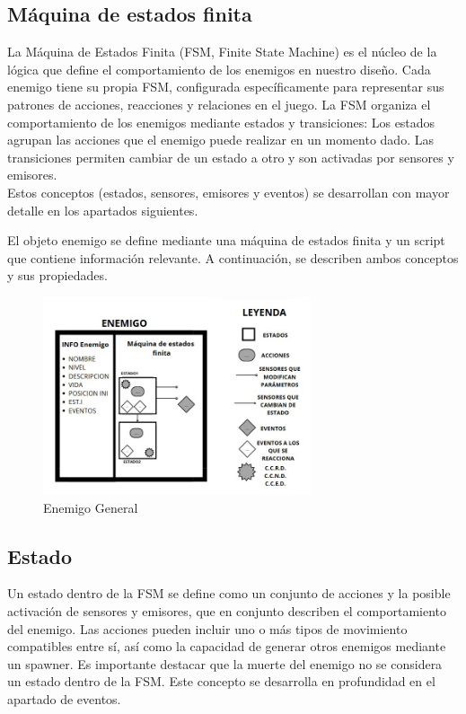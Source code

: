 \subsection{Máquina de estados finita}

La Máquina de Estados Finita (FSM, Finite State Machine) es el núcleo de la lógica que define el comportamiento de los enemigos en nuestro diseño. Cada enemigo tiene su propia FSM, configurada específicamente para representar sus patrones de acciones, reacciones y relaciones en el juego. La FSM organiza el comportamiento de los enemigos mediante estados y transiciones:
Los estados agrupan las acciones que el enemigo puede realizar en un momento dado.
Las transiciones permiten cambiar de un estado a otro y son activadas por sensores y emisores.\\
Estos conceptos (estados, sensores, emisores y eventos) se desarrollan con mayor detalle en los apartados siguientes.

El objeto enemigo se define mediante una máquina de estados finita y un script que contiene información relevante. A continuación, se describen ambos conceptos y sus propiedades.\\
\begin{figure}[h]
	\centering
	\includegraphics[width = 0.7\textwidth]{Imagenes/EnemigoGeneral.png}
	\caption{Enemigo General }
	\label{fig:EnemigoGeneral}
\end{figure}

\subsection{Estado}
Un estado dentro de la FSM se define como un conjunto de acciones y la posible activación de sensores y emisores, que en conjunto describen el comportamiento del enemigo. Las acciones pueden incluir uno o más tipos de movimiento compatibles entre sí, así como la capacidad de generar otros enemigos mediante un spawner.
Es importante destacar que la muerte del enemigo no se considera un estado dentro de la FSM. Este concepto se desarrolla en profundidad en el apartado de eventos.\\

